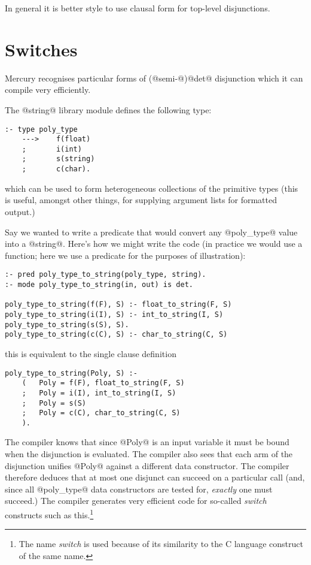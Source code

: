 In general it is better style to use clausal form for
top-level disjunctions.

\section{Switches}
Mercury recognises particular forms of (@semi-@)@det@
disjunction which it can compile very efficiently.

The @string@ library module defines the following type:
\begin{verbatim}
:- type poly_type
    --->    f(float)
    ;       i(int)
    ;       s(string)
    ;       c(char).
\end{verbatim}
which can be used to form heterogeneous collections of the
primitive types (this is useful, amongst other things, for
supplying argument lists for formatted output.)

Say we wanted to write a predicate that would convert any
@poly_type@ value into a @string@.  Here's how we might write the
code (in practice we would use a function; here we use a
predicate for the purposes of illustration):
\begin{verbatim}
:- pred poly_type_to_string(poly_type, string).
:- mode poly_type_to_string(in, out) is det.

poly_type_to_string(f(F), S) :- float_to_string(F, S)
poly_type_to_string(i(I), S) :- int_to_string(I, S)
poly_type_to_string(s(S), S).
poly_type_to_string(c(C), S) :- char_to_string(C, S)
\end{verbatim}
this is equivalent to the single clause definition
\begin{verbatim}
poly_type_to_string(Poly, S) :-
    (   Poly = f(F), float_to_string(F, S)
    ;   Poly = i(I), int_to_string(I, S)
    ;   Poly = s(S)
    ;   Poly = c(C), char_to_string(C, S)
    ).
\end{verbatim}

The compiler knows that since @Poly@ is an input variable it
must be bound when the disjunction is evaluated.  The compiler
also sees that each arm of the disjunction unifies @Poly@
against a different data constructor.  The compiler therefore
deduces that at most one disjunct can succeed on a particular
call (and, since all @poly_type@ data constructors are tested
for, \emph{exactly} one must succeed.)  The compiler generates very
efficient code for so-called \emph{switch} constructs such as this.\footnote{The name \emph{switch} is used because of its similarity
to the C language construct of the same name.}

